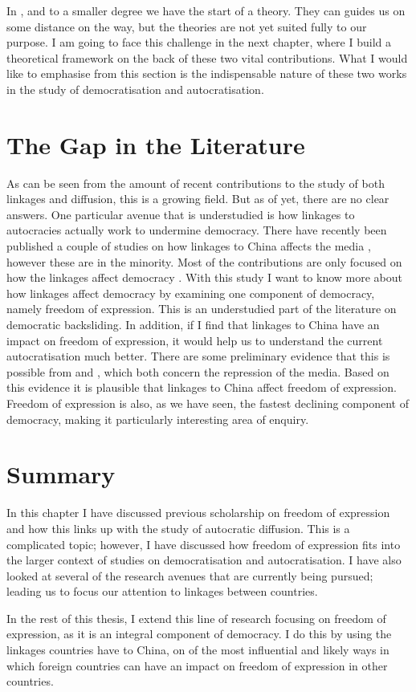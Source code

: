 In \citet{tansey_ties_2017}, and to a smaller degree \citet{levitsky_linkage_2006} we have the start of a theory. They can guides us on some distance on the way, but the theories are not yet suited fully to our purpose. I am going to face this challenge in the next chapter, where I build a theoretical framework on the back of these two vital contributions. What I would like to emphasise from this section is the indispensable nature of these two works in the study of democratisation and autocratisation. 

\section{The Gap in the Literature}
As can be seen from the amount of recent contributions to the study of both linkages and diffusion, this is a growing field. But as of yet, there are no clear answers. One particular avenue that is understudied is how linkages to autocracies actually work to undermine democracy. There have recently been published a couple of studies on how linkages to China affects the media \citep{gamso_is_2021, toettoe_foreign_2023}, however these are in the minority. Most of the contributions are only focused on how the linkages affect democracy \citep{bader_china_2015, levitsky_linkage_2006, risse_democracy_2015, tansey_ties_2017, weyland_autocratic_2017}. With this study I want to know more about how linkages affect democracy by examining one component of democracy, namely freedom of expression. This is an understudied part of the literature on democratic backsliding. In addition, if I find that linkages to China have an impact on freedom of expression, it would help us to understand the current autocratisation much better. There are some preliminary evidence that this is possible from \citet{gamso_is_2021} and \citet{toettoe_foreign_2023}, which both concern the repression of the media. Based on this evidence it is plausible that linkages to China affect freedom of expression. Freedom of expression is also, as we have seen, the fastest declining component of democracy, making it particularly interesting area of enquiry. 

\section{Summary}
In this chapter I have discussed previous scholarship on freedom of expression and how this links up with the study of autocratic diffusion. This is a complicated topic; however, I have discussed how freedom of expression fits into the larger context of studies on democratisation and autocratisation. I have also looked at several of the research avenues that are currently being pursued; leading us to focus our attention to linkages between countries. 

In the rest of this thesis, I extend this line of research focusing on freedom of expression, as it is an integral component of democracy. I do this by using the linkages countries have to China, on of the most influential and likely ways in which foreign countries can have an impact on freedom of expression in other countries.